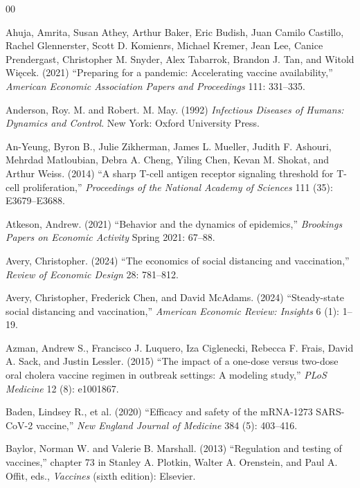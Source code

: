 \documentclass[12pt]{article}
\newcommand{\Wiecek}{Wi\k{e}cek}
\begin{document}
\begin{thebibliography}{00}

\frenchspacing

Ahuja, Amrita, Susan Athey, Arthur Baker, Eric Budish, Juan Camilo
Castillo, Rachel Glennerster, Scott D. Komienrs, Michael Kremer, Jean
Lee, Canice Prendergast, Christopher M. Snyder, Alex Tabarrok, Brandon
J. Tan, and Witold \Wiecek. (2021) ``Preparing for a pandemic:
Accelerating vaccine availability,'' {\em American Economic
  Association Papers and Proceedings} 111: 331--335.

Anderson, Roy. M. and Robert. M. May. (1992) {\em Infectious Diseases of
  Humans: Dynamics and Control}. New York: Oxford University Press.

An-Yeung, Byron B., Julie Zikherman, James L. Mueller, Judith
F. Ashouri, Mehrdad Matloubian, Debra A. Cheng, Yiling Chen, Kevan
M. Shokat, and Arthur Weiss. (2014) ``A sharp T-cell antigen receptor
signaling threshold for T-cell proliferation,'' {\em Proceedings of
  the National Academy of Sciences} 111 (35): E3679--E3688.

Atkeson, Andrew. (2021) ``Behavior and the dynamics of epidemics,''
{\em Brookings Papers on Economic Activity} Spring 2021: 67--88.

Avery, Christopher. (2024) ``The economics of social distancing and
vaccination,'' {\em Review of Economic Design} 28: 781--812.

Avery, Christopher, Frederick Chen, and David McAdams. (2024)
``Steady-state social distancing and vaccination,'' {\em American
  Economic Review: Insights} 6 (1): 1--19.

Azman, Andrew S., Francisco J. Luquero, Iza Ciglenecki, Rebecca
F. Frais, David A. Sack, and Justin Lessler. (2015) ``The impact of a
one-dose versus two-dose oral cholera vaccine regimen in outbreak
settings: A modeling study,'' {\em PLoS Medicine} 12 (8): e1001867.

Baden, Lindsey R., et al. (2020) ``Efficacy and safety of the mRNA-1273
SARS-CoV-2 vaccine,'' {\em New England Journal of Medicine} 384 (5):
403--416.

Baylor, Norman W. and Valerie B. Marshall. (2013) ``Regulation and
testing of vaccines,'' chapter 73 in Stanley A. Plotkin, Walter
A. Orenstein, and Paul A. Offit, eds., {\em Vaccines} (sixth edition):
Elsevier.


\end{thebibliography}
\end{document}

